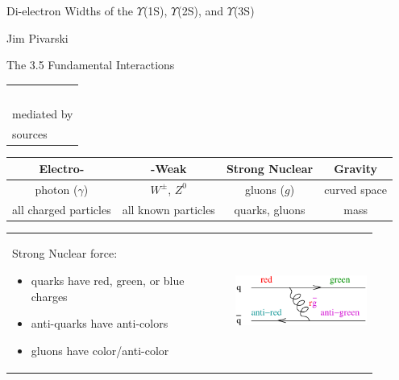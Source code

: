\documentclass[landscape]{article}
\begin{document}
\begin{slide}
\begin{center}
\Huge
  Di-electron Widths of the $\Upsilon$(1S), $\Upsilon$(2S), and $\Upsilon$(3S)

  \vspace{2 cm} Jim Pivarski
\end{center}
\end{slide}

\addtocounter{page}{-1}

\begin{slide:intro}

The 3.5 Fundamental Interactions
\renewcommand{\arraystretch}{1.25}
\begin{center}
{\color{dkgrey}
\begin{tabular}{l}
  \mbox{ } \\
  mediated by \\
  sources
\end{tabular}
\begin{tabular}{c | c | c | c}
  Electro- & -Weak & \color{black} Strong Nuclear & Gravity \\ \hline
  photon ($\gamma$) & $W^\pm$, $Z^0$ & \color{black} gluons ($g$) & curved space \\
  all charged particles & all known particles & \color{black} quarks, gluons & mass
\end{tabular}}
\end{center}

\vfill
\begin{center}
\begin{tabular}{p{0.5\linewidth} p{0.05\linewidth} p{0.35\linewidth}}
\begin{minipage}{\linewidth}
Strong Nuclear force:
\begin{itemize}

  \item quarks have {\color{red} red,} {\color{dkgreen} green,} or {\color{blue} blue} charges

  \item anti-quarks have anti-colors

  \item gluons have color/anti-color

\end{itemize}
\end{minipage} & &
\begin{minipage}{\linewidth}
\includegraphics[width=\linewidth]{plots/intro1}
\end{minipage}
\end{tabular}
\end{center}


\end{slide:intro}
\end{document}
